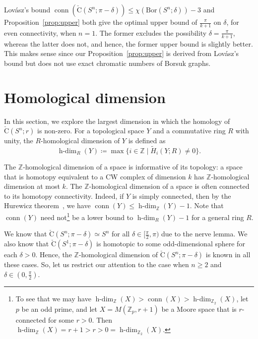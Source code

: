 \documentclass[11 pt,a4paper,twoside,reqno]{amsart}
\theoremstyle{definition}
\def\Z{{\mathbb Z}}
\newcommand{\cech}[2]{\mathrm{\check{C}}(#1;#2)}
\DeclareMathOperator{\conn}{conn}
\newcommand{\bor}[2]{\mathrm{Bor}(#1;#2)}
\DeclareMathOperator{\hdim}{h-dim}
\begin{document}
Lov{\'a}sz's bound $\conn(\cech{S^n}{\pi-\delta}) \le \chi(\bor{S^n}{\delta}) - 3$ and Proposition~\ref{prop:upper} both give the optimal upper bound of $\tfrac{\pi}{k+1}$ on $\delta$, for even connectivity, when $n=1$.
The former excludes the possibility $\delta=\tfrac{\pi}{k+1}$, whereas the latter does not, and hence, the former upper bound is slightly better.
This makes sense since our Proposition~\ref{prop:upper} is derived from Lov{\'a}sz's bound but does not use exact chromatic numbers of Borsuk graphs.



\section{Homological dimension}
\label{sec:hdim}

In this section, we explore the largest dimension in which the homology of $\cech{S^n}{r}$ is non-zero.
For a topological space $Y$ and a commutative ring $R$ with unity, the $R$-homological dimension of $Y$ is defined as 
\[
\hdim_R(Y) \coloneqq \max\{i\in\Z \mid \widetilde{H}_i(Y;R) \ne 0\}.
\]

The $\Z$-homological dimension of a space is informative of its topology: a space that is homotopy equivalent to a CW complex of dimension $k$ has $\Z$-homological dimension at most $k$.
The $\Z$-homological dimension of a space is often connected to its homotopy connectivity.
Indeed, if $Y$ is simply connected, then by the Hurewicz theorem~\cite[Theorem~4.32]{Hatcher}, we have $\conn(Y) \le \hdim_{\Z}(Y)-1$.
Note that $\conn(Y)$ need not\footnote{
To see that we may have $\hdim_{\Z}(X) > \conn(X) > \hdim_{\Z_2}(X)$, let $p$ be an odd prime, and let $X = M(\Z_p,r+1)$ be a Moore space that is $r$-connected for some $r>0$.
Then $\hdim_{\Z}(X)=r+1>r>0=\hdim_{\Z_2}(X)$.
}
be a lower bound to $\hdim_R(Y)-1$ for a general ring $R$.

We know that $\cech{S^n}{\pi-\delta}\simeq S^n$ for all $\delta\in[\tfrac{\pi}{2},\pi)$ due to the nerve lemma.
We also know that $\cech{S^1}{\pi-\delta}$ is homotopic to some odd-dimensional sphere for each $\delta>0$.
Hence, the $\Z$-homological dimension of $\cech{S^n}{\pi-\delta}$ is known in all these cases.
So, let us restrict our attention to the case when $n\ge 2$ and $\delta\in(0,\tfrac{\pi}{2})$.
\end{document}
